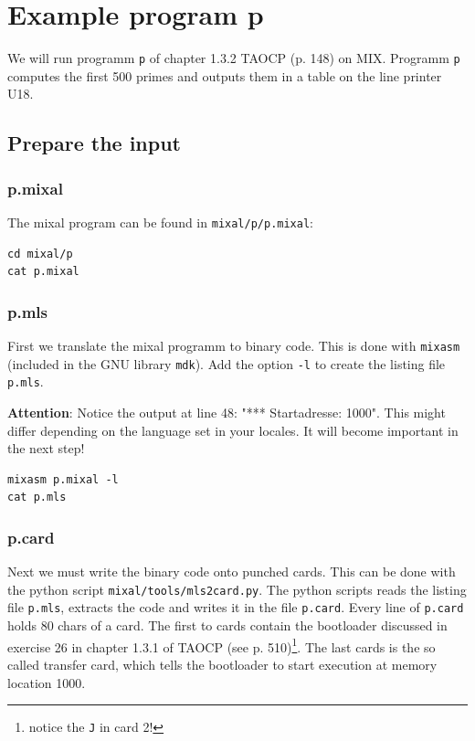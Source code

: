 \documentclass[a4paper,ngerman]{scrartcl}
\begin{document}
\section{Example program p}
We will run programm \lstinline|p| of chapter 1.3.2 TAOCP (p. 148) on MIX. Programm \lstinline|p| computes the first 500 primes and outputs them in a table on the line printer U18.
\subsection{Prepare the input}
\subsubsection{p.mixal}
The mixal program can be found in \lstinline|mixal/p/p.mixal|:

\begin{lstlisting}[numbers=none,frame=none]
cd mixal/p
cat p.mixal
\end{lstlisting}



\subsubsection{p.mls}
First we translate the mixal programm to binary code. This is done with \lstinline|mixasm| (included in the GNU library \lstinline|mdk|). Add the option \lstinline|-l| to create the listing file \lstinline|p.mls|.

\textbf{Attention}: Notice the output at line 48: "*** Startadresse: 1000". This might differ depending on the language set in your locales. It will become important in the next step!

\begin{lstlisting}[numbers=none,frame=none]
mixasm p.mixal -l
cat p.mls
\end{lstlisting}


\subsubsection{p.card}
Next we must write the binary code onto punched cards. This can be done with the python script \lstinline|mixal/tools/mls2card.py|.
The python scripts reads the listing file \lstinline|p.mls|, extracts the code and writes it in the file \lstinline|p.card|.
Every line of \lstinline|p.card| holds 80 chars of a card. The first to cards contain the bootloader discussed in exercise 26 in chapter 1.3.1 of TAOCP (see p. 510)\footnote{notice the \lstinline|J| in card 2!}. The last cards is the so called transfer card, which tells the bootloader to start execution at memory location 1000.
\end{document}
